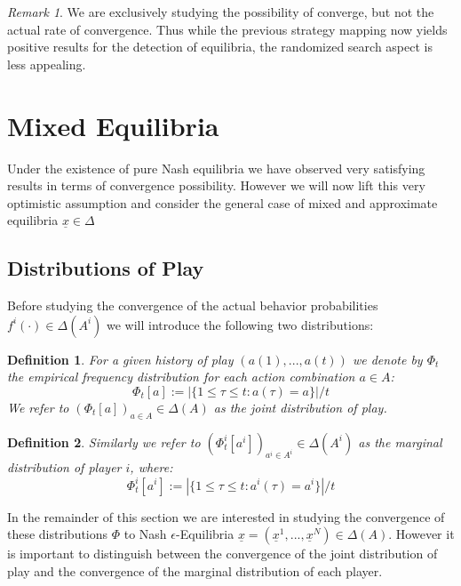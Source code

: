 \documentclass[a4paper]{article}
\theoremstyle{plain}
\newtheorem{definition}{Definition}
\theoremstyle{remark}
\newtheorem{remark}{Remark}
\newcommand{\eq}[1]{\underline{#1}}
\begin{document}
\begin{remark}
	We are exclusively studying the possibility of converge, but not the actual rate of convergence.
	Thus while the previous strategy mapping now yields positive results for the detection of equilibria,
	the randomized search aspect is less appealing.
\end{remark}


\section{Mixed Equilibria}

Under the existence of pure Nash equilibria we have observed very satisfying results in terms of convergence
possibility. However we will now lift this very optimistic assumption and consider the general case of mixed and
approximate equilibria $\eq{x} \in \Delta$


\subsection{Distributions of Play}

Before studying the convergence of the actual behavior probabilities $f^i(\cdot) \in \Delta(A^i)$ we will
introduce the following two distributions:

\begin{definition}
	For a given history of play $(a(1), ..., a(t))$ we denote by $\Phi_t$  the empirical frequency
	distribution for each action combination $a \in A$:
	$$
		\Phi_t[a] := |\{ 1 \leq \tau \leq t : a(\tau) = a \}|/t
	$$
	We refer to $(\Phi_t[a])_{a \in A} \in \Delta(A)$ as the joint distribution of play.
\end{definition}
\begin{definition}
	Similarly we refer to $(\Phi_t^i[a^i])_{a^i \in A^i} \in \Delta(A^i)$ as the marginal distribution of player $i$, where:
	$$
		\Phi_t^i[a^i] := |\{ 1 \leq \tau \leq t : a^i(\tau) = a^i \}|/t
	$$
\end{definition}

In the remainder of this section we are interested in studying the convergence of these distributions $\Phi$ to Nash 
$\epsilon$-Equilibria $\eq{x} = (\eq{x}^1, ..., \eq{x}^N) \in \Delta(A)$.
However it is important to distinguish between the convergence of the joint distribution of play
and the convergence of the marginal distribution of each player.
\end{document}
